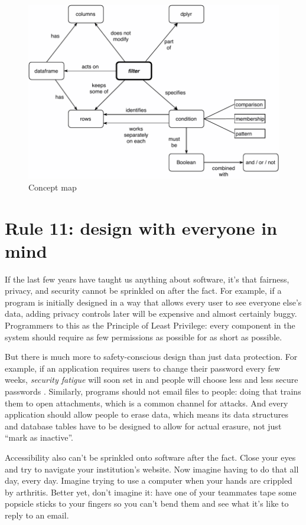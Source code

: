 \documentclass[10pt,letterpaper]{article}
\begin{document}
\begin{figure}
  \centering
  \includegraphics[scale=0.6]{concept-map.pdf}
  \caption{Concept map}
  \label{concept-map.pdf}
\end{figure}

\section*{Rule 11: design with everyone in mind}

If the last few years have taught us anything about software,
it's that fairness, privacy, and security cannot be sprinkled on after the fact.
For example,
if a program is initially designed in a way that allows every user to see everyone else's data,
adding privacy controls later will be expensive and almost certainly buggy.
Programmers to this as the Principle of Least Privilege:
every component in the system should require as few permissions as possible
for as short as possible.

But there is much more to safety-conscious design than just data protection.
For example,
if an application requires users to change their password every few weeks,
\emph{security fatigue} will soon set in
and people will choose less and less secure passwords \cite{Smalls2021}.
Similarly,
programs should not email files to people:
doing that trains them to open attachments,
which is a common channel for attacks.
And every application should allow people to erase data,
which means its data structures and database tables have to be designed to allow for actual erasure,
not just ``mark as inactive''.

Accessibility also can't be sprinkled onto software after the fact.
Close your eyes and try to navigate your institution's website.
Now imagine having to do that all day, every day.
Imagine trying to use a computer when your hands are crippled by arthritis.
Better yet, don't imagine it:
have one of your teammates tape some popsicle sticks to your fingers so you can't bend them
and see what it's like to reply to an email.
\end{document}
